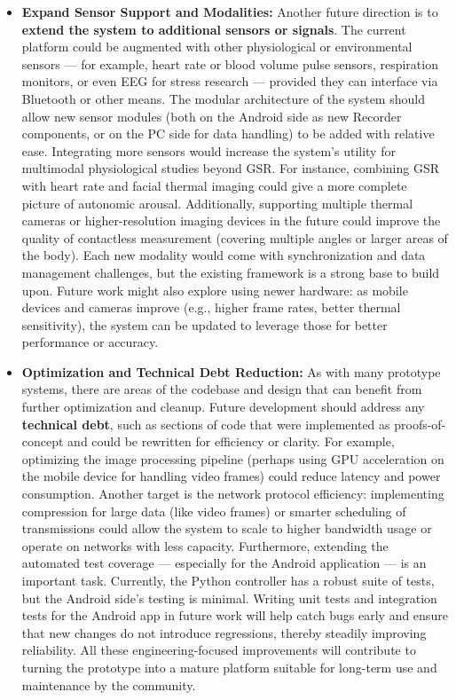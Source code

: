 \begin{itemize}
\item \textbf{Expand Sensor Support and Modalities:} Another future direction is
  to \textbf{extend the system to additional sensors or signals}. The current
  platform could be augmented with other physiological or environmental
  sensors --- for example, heart rate or blood volume pulse sensors,
  respiration monitors, or even EEG for stress research --- provided they
  can interface via Bluetooth or other means. The modular architecture
  of the system should allow new sensor modules (both on the Android
  side as new Recorder components, or on the PC side for data handling)
  to be added with relative ease. Integrating more sensors would
  increase the system's utility for multimodal physiological studies
  beyond GSR. For instance, combining GSR with heart rate and facial
  thermal imaging could give a more complete picture of autonomic
  arousal. Additionally, supporting multiple thermal cameras or
  higher-resolution imaging devices in the future could improve the
  quality of contactless measurement (covering multiple angles or larger
  areas of the body). Each new modality would come with synchronization
  and data management challenges, but the existing framework is a strong
  base to build upon. Future work might also explore using newer
  hardware: as mobile devices and cameras improve (e.g., higher frame
  rates, better thermal sensitivity), the system can be updated to
  leverage those for better performance or accuracy.

\item \textbf{Optimization and Technical Debt Reduction:} As with many prototype
  systems, there are areas of the codebase and design that can benefit
  from further optimization and cleanup. Future development should
  address any \textbf{technical debt}, such as sections of code that were
  implemented as proofs-of-concept and could be rewritten for efficiency
  or clarity. For example, optimizing the image processing pipeline
  (perhaps using GPU acceleration on the mobile device for handling
  video frames) could reduce latency and power consumption. Another
  target is the network protocol efficiency: implementing compression
  for large data (like video frames) or smarter scheduling of
  transmissions could allow the system to scale to higher bandwidth
  usage or operate on networks with less capacity. Furthermore,
  extending the automated test coverage --- especially for the Android
  application --- is an important task. Currently, the Python controller
  has a robust suite of tests, but the Android side's testing is
  minimal. Writing unit tests and integration tests for the Android app
  in future work will help catch bugs early and ensure that new changes
  do not introduce regressions, thereby steadily improving reliability.
  All these engineering-focused improvements will contribute to turning
  the prototype into a mature platform suitable for long-term use and
  maintenance by the community.


\end{itemize}
